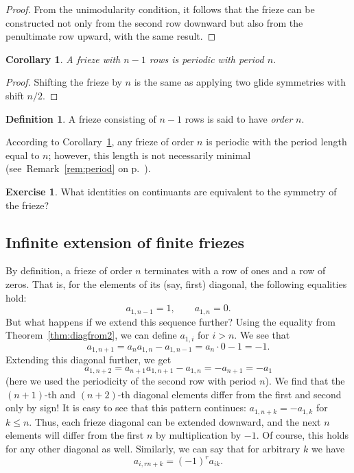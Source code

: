 \documentclass[a4paper,11pt]{amsart}
\theoremstyle{plain}
\newtheorem{corollary}[theorem]{Corollary}
\theoremstyle{remark}
\theoremstyle{definition}
\newtheorem{definition}[theorem]{Definition}
\newtheorem{exercise}[theorem]{Exercise}
\numberwithin{equation}{section}
\numberwithin{figure}{section}
\begin{document}
\begin{proof}
From the unimodularity condition, it follows that the frieze can be constructed not only from the second row downward but also from the penultimate row upward, with the same result.
\end{proof}

\begin{corollary}\label{cor:periodic}
A frieze with $n-1$ rows is periodic with period $n$.
\end{corollary}

\begin{proof}
Shifting the frieze by $n$ is the same as applying two glide symmetries with shift $n/2$.
\end{proof}

\begin{definition} A frieze consisting of $n-1$ rows is said to have \emph{order} $n$.
\end{definition}

According to Corollary~\ref{cor:periodic}, any frieze of order $n$ is periodic with the period length equal to $n$; however, this length is not necessarily minimal (see~Remark~\ref{rem:period} on p.~\pageref{rem:period}).

\begin{exercise}
What identities on continuants are equivalent to the symmetry of the frieze?
\end{exercise}

\subsection{Infinite extension of finite friezes} By definition, a frieze of order $n$ terminates with a row of ones and a row of zeros. That is, for the elements of its (say, first) diagonal, the following equalities hold:
\[
a_{1,n-1}=1, \qquad a_{1,n}=0.
\]
But what happens if we extend this sequence further? Using the equality from Theorem~\ref{thm:diagfrom2}, we can define $a_{1,i}$ for $i>n$. We see that
\[
a_{1,n+1}=a_{n}a_{1,n}-a_{1,n-1}=a_n\cdot 0-1=-1.
\]
Extending this diagonal further, we get
\[
a_{1,n+2}=a_{n+1}a_{1,n+1}-a_{1,n}=-a_{n+1}=-a_1
\]
(here we used the periodicity of the second row with period $n$). We find that the $(n+1)$-th and $(n+2)$-th diagonal elements differ from the first and second only by sign! It is easy to see that this pattern continues: $a_{1,n+k}=-a_{1,k}$ for $k\leq n$. Thus, each frieze diagonal can be extended downward, and the next $n$ elements will differ from the first $n$ by multiplication by $-1$. Of course, this holds for any other diagonal as well. Similarly, we can say that for arbitrary $k$ we have
\[
a_{i,rn+k}=(-1)^r a_{ik}.
\]
\end{document}
